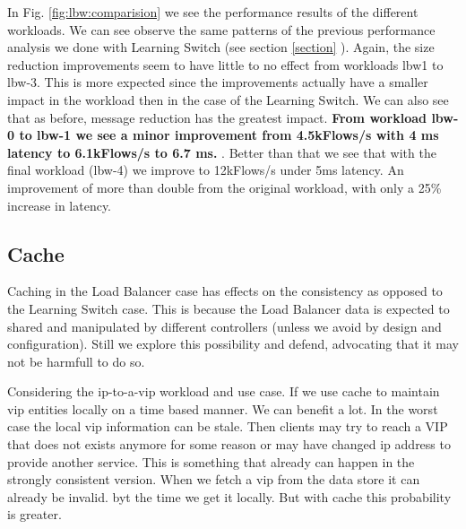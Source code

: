

In Fig. \ref{fig:lbw:comparision} we see the performance results of
the different workloads. We can see observe the same patterns of the
previous performance analysis we done with Learning Switch (see
section \ref{section} ). Again, the size reduction improvements seem
to have little to no effect from workloads  lbw1 to lbw-3. This is
more expected since the improvements actually have a smaller  impact
in the workload then in the case of the Learning Switch. We can also
see that as before, message reduction has the greatest impact. \textbf{From
workload lbw-0 to lbw-1 we see a minor improvement from 4.5kFlows/s
with 4 ms latency to 6.1kFlows/s to 6.7 ms. }. Better than that we see
that with the final workload (lbw-4) we improve to 12kFlows/s  under
5ms latency. An improvement of more than double from the original
workload, with only a 25\% increase in latency. 


\subsection{Cache}
Caching in the Load Balancer case has effects on the consistency as
opposed to the Learning Switch case. This is because the Load Balancer
data is expected to shared and manipulated by different controllers
(unless we avoid by design and configuration). Still we explore this
possibility and defend, advocating that it may not be harmfull to do
so. 

Considering the ip-to-a-vip workload and use case. If we use cache to
maintain \gls{vip} entities locally on a time based manner. We can
benefit a lot. In the worst case the local \gls{vip} information can
be stale. Then clients may try to reach a VIP that does not exists
anymore for some reason or may have changed \gls{ip}  address to
provide another service. This is something that already can happen in
the strongly consistent version. When we fetch a \gls{vip} from the
data store it can already be invalid.  byt the time we get it
locally. But with cache this probability is greater.


